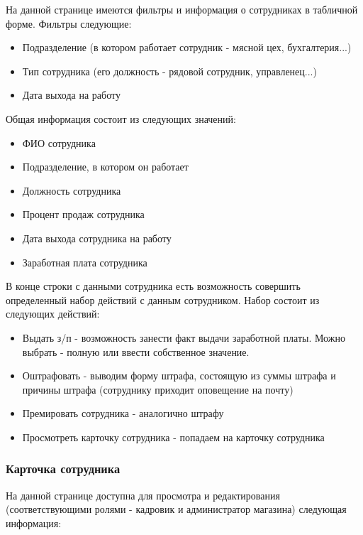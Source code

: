 \documentclass[DIV=calc, paper=a4, fontsize=11pt]{scrartcl} %
\begin{document}
На данной странице имеются фильтры и информация о сотрудниках в табличной форме. Фильтры следующие:

\begin{itemize}
	\item Подразделение (в котором работает сотрудник - мясной цех, бухгалтерия...)
	\item Тип сотрудника (его должность - рядовой сотрудник, управленец...)
	\item Дата выхода на работу
\end{itemize}

Общая информация состоит из следующих значений:

\begin{itemize}
	\item ФИО сотрудника
	\item Подразделение, в котором он работает 
	\item Должность сотрудника
	\item Процент продаж сотрудника
	\item Дата выхода сотрудника на работу
	\item Заработная плата сотрудника
\end{itemize}

В конце строки с данными сотрудника есть возможность совершить определенный набор действий с данным сотрудником. Набор состоит из следующих действий:
\begin{itemize}
	\item Выдать з/п - возможность занести факт выдачи заработной платы. Можно выбрать - полную или ввести собственное значение.
	\item Оштрафовать - выводим форму штрафа, состоящую из суммы штрафа и причины штрафа (сотруднику приходит оповещение на почту)
	\item Премировать сотрудника - аналогично штрафу
	\item Просмотреть карточку сотрудника - попадаем на карточку сотрудника
\end{itemize}

\subsubsection{Карточка сотрудника}

На данной странице доступна для просмотра и редактирования (соответствующими ролями - кадровик и администратор магазина) следующая информация:
\end{document}
